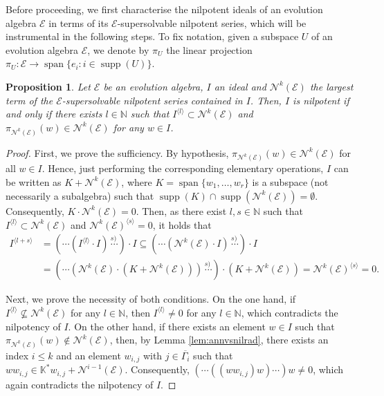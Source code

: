 \documentclass[12pt,reqno]{amsart}
\newtheorem{proposition}[theorem]{Proposition}
\theoremstyle{definition}
\theoremstyle{remark}
\DeclareMathOperator{\spa}{span}
\DeclareMathOperator{\supp}{supp}
\numberwithin{equation}{section}
\begin{document}
Before proceeding, we first characterise the nilpotent ideals of an evolution algebra $\mathcal{E}$ in terms of its $\mathcal{E}$-supersolvable nilpotent series, which will be instrumental in the following steps. To fix notation, given a subspace $U$ of an evolution algebra $\mathcal{E}$, we denote by $\pi_U$ the linear projection $\pi_U\colon\mathcal{E}\longrightarrow\spa\{e_i\colon i\in\supp(U)\}$.

\begin{proposition}\label{prop:nilp_series}
	Let $\mathcal{E}$ be an evolution algebra, $I$ an ideal and $\mathcal{N}^k(\mathcal{E})$ the largest term of the $\mathcal{E}$-supersolvable nilpotent series contained in $I$. Then, $I$ is nilpotent if and only if there exists $l\in\mathbb{N}$ such that $I^{\langle l \rangle}\subset\mathcal{N}^k(\mathcal{E})$ and $\pi_{\mathcal{N}^k(\mathcal{E})}(w)\in\mathcal{N}^k(\mathcal{E})$ for any $w\in I$.
\end{proposition}
\begin{proof}
	First, we prove the sufficiency. By hypothesis, $\pi_{\mathcal{N}^k(\mathcal{E})}(w)\in\mathcal{N}^k(\mathcal{E})$ for all $w\in I$. Hence, just performing the corresponding elementary operations, $I$ can be written as $K+\mathcal{N}^k(\mathcal{E})$, where $K=\spa\{w_1,\dots,w_r\}$ is a subspace (not necessarily a subalgebra) such that $\supp(K)\cap\supp(\mathcal{N}^k(\mathcal{E}))=\emptyset$. Consequently, $K\cdot\mathcal{N}^k(\mathcal{E})=0$. Then, as there exist $l,s\in\mathbb{N}$ such that $I^{\langle l \rangle}\subset\mathcal{N}^k(\mathcal{E})$ and $\mathcal{N}^k(\mathcal{E})^{\langle s \rangle}=0$, it holds that 
	\begin{align*}
	I^{\langle l+s \rangle}&=(\cdots(I^{\langle l\rangle}\cdot I)\overset{s)}{\,\cdots})\cdot I\subseteq(\cdots(\mathcal{N}^k(\mathcal{E})\cdot I)\overset{s)}{\,\cdots})\cdot I\\
	&=(\cdots(\mathcal{N}^k(\mathcal{E})\cdot (K+\mathcal{N}^k(\mathcal{E})))\overset{s)}{\,\cdots})\cdot (K+\mathcal{N}^k(\mathcal{E}))=\mathcal{N}^k(\mathcal{E})^{\langle s \rangle}=0.
	\end{align*}
	
	Next, we prove the necessity of both conditions. On the one hand, if $I^{\langle l\rangle}\nsubseteq\mathcal{N}^k(\mathcal{E})$ for any $l\in\mathbb{N}$, then $I^{\langle l\rangle}\neq0$ for any $l\in\mathbb{N}$, which contradicts the nilpotency of $I$. On the other hand, if there exists an element $w\in I$ such that $\pi_{\mathcal{N}^k(\mathcal{E})}(w)\notin\mathcal{N}^k(\mathcal{E})$, then, by Lemma \ref{lem:annvsnilrad}, there exists an index $i\leq k$ and an element $w_{i,j}$ with $j\in\overline{\varGamma_i}$ such that $w w_{i,j}\in\mathbb{K}^*w_{i,j}+\mathcal{N}^{i-1}(\mathcal{E})$. Consequently, $(\cdots((ww_{i,j})w)\cdots)w\neq0$, which again contradicts the nilpotency of $I$.
\end{proof}
\end{document}
